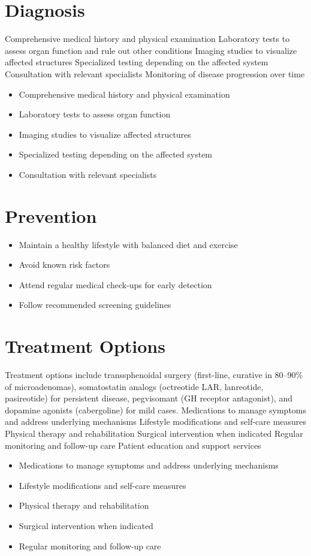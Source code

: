 \section{Diagnosis}
Comprehensive medical history and physical examination Laboratory tests to assess organ function and rule out other conditions Imaging studies to visualize affected structures Specialized testing depending on the affected system Consultation with relevant specialists Monitoring of disease progression over time

\begin{itemize}[noitemsep]
  \item Comprehensive medical history and physical examination
  \item Laboratory tests to assess organ function
  \item Imaging studies to visualize affected structures
  \item Specialized testing depending on the affected system
  \item Consultation with relevant specialists
\end{itemize}
\section{Prevention}
\begin{itemize}[noitemsep]
  \item Maintain a healthy lifestyle with balanced diet and exercise
  \item Avoid known risk factors
  \item Attend regular medical check-ups for early detection
  \item Follow recommended screening guidelines
\end{itemize}
\section{Treatment Options}
Treatment options include transsphenoidal surgery (first-line, curative in 80--90\% of microadenomas), somatostatin analogs (octreotide LAR, lanreotide, pasireotide) for persistent disease, pegvisomant (GH receptor antagonist), and dopamine agonists (cabergoline) for mild cases. Medications to manage symptoms and address underlying mechanisms Lifestyle modifications and self-care measures Physical therapy and rehabilitation Surgical intervention when indicated Regular monitoring and follow-up care Patient education and support services

\begin{itemize}[noitemsep]
  \item Medications to manage symptoms and address underlying mechanisms
  \item Lifestyle modifications and self-care measures
  \item Physical therapy and rehabilitation
  \item Surgical intervention when indicated
  \item Regular monitoring and follow-up care
\end{itemize}
